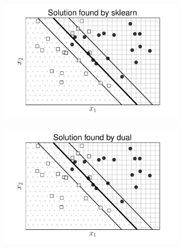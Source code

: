 \begin{figure}[t]
\begin{subfigure}{0.325\textwidth}
\includegraphics[width=\linewidth]{ebookML_src/src/softmargin_svm/svm_sklearn.pdf}
\caption{}
\end{subfigure}
\begin{subfigure}{0.325\textwidth}
\includegraphics[width=\linewidth]{ebookML_src/src/softmargin_svm/svm_dual.pdf}
\caption{}
\end{subfigure}
\begin{subfigure}{0.325\textwidth}

\end{subfigure}
\end{figure}
